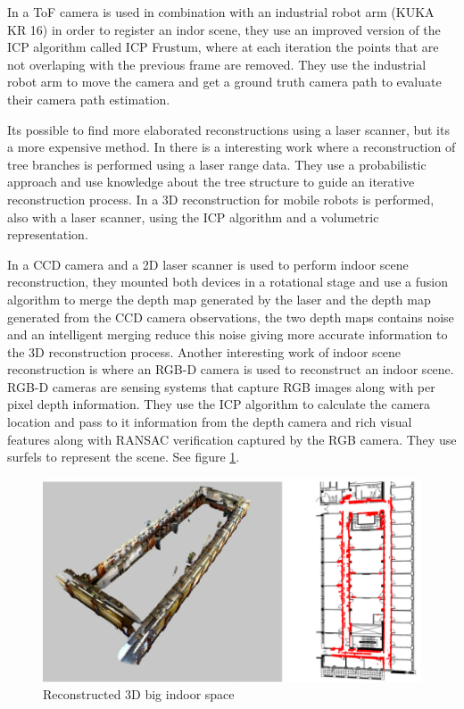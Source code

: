 In \cite{may2009} a ToF camera is used in combination with an industrial robot arm (KUKA KR 16) in order to register an indor scene,
they use an improved version of the ICP algorithm called ICP Frustum, where at each iteration the points that are not overlaping with the previous frame are removed. They use the industrial robot arm to move the camera and get a ground truth camera path to evaluate their camera path estimation.

Its possible to find more elaborated reconstructions using a laser scanner, but its a more expensive method. In 
\cite{binney} there is a interesting work where a reconstruction of tree branches is performed using a laser range 
data. They use a probabilistic approach and use knowledge about the tree structure to guide an iterative reconstruction 
process. In \cite{keqiang} a 3D reconstruction for mobile robots is performed, also with a laser scanner, 
using the ICP algorithm and a volumetric representation.


In \cite{wei} a CCD camera and a 2D laser scanner is used to perform indoor scene reconstruction, they mounted both devices in a rotational stage and use a fusion algorithm to merge the depth map generated by the laser and the depth map generated from the CCD camera observations, the two depth maps contains noise and an intelligent merging reduce this
 noise giving more accurate information to the 3D reconstruction process. Another interesting work of indoor scene reconstruction is \cite{henry} where an RGB-D camera is used to reconstruct an indoor scene. RGB-D cameras are sensing systems that capture RGB images
 along with per pixel depth information. They use the ICP algorithm to calculate the camera location and pass to it information from 
the depth camera and  rich visual
 features along with RANSAC verification captured by the RGB camera. They use surfels \cite{pfister} to represent the scene. See figure \ref{fig:henry}.

\begin{figure}[h!]
\begin{center}
\includegraphics[scale=0.29]{images/henry}
\caption{Reconstructed 3D big indoor space}
\label{fig:henry}
\end{center}
\end{figure}

